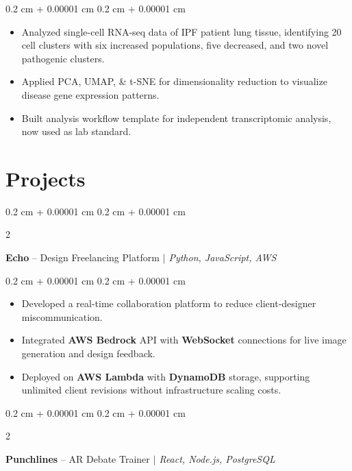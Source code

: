 \documentclass[10pt, letterpaper]{article}
\newenvironment{highlights}{
    \begin{itemize}[
        topsep=0.10 cm,
        parsep=0.10 cm,
        partopsep=0pt,
        itemsep=0pt,
        leftmargin=0.4 cm + 10pt
    ]
}{
    \end{itemize}
} %
\newenvironment{onecolentry}{
    \begin{adjustwidth}{
        0.2 cm + 0.00001 cm
    }{
        0.2 cm + 0.00001 cm
    }
}{
    \end{adjustwidth}
} %
\newenvironment{twocolentry}[2][]{
    \onecolentry
    \def\secondColumn{#2}
    \setcolumnwidth{\fill, 5 cm}
    \begin{paracol}{2}
}{
    \switchcolumn \raggedleft \secondColumn
    \end{paracol}
    \endonecolentry
} %
\let\hrefWithoutArrow\href
\renewcommand{\href}[2]{\hrefWithoutArrow{#1}{\ifthenelse{\equal{#2}{}}{ }{#2 }\raisebox{.15ex}{\footnotesize \faExternalLink*}}}
\begin{document}
        \vspace{0.10 cm}
        \begin{onecolentry}
            \begin{highlights}
                \item Analyzed single-cell RNA-seq data of IPF patient lung tissue, identifying 20 cell clusters with six increased populations, five decreased, and two novel pathogenic clusters.
                \item Applied PCA, UMAP, \& t-SNE for dimensionality reduction to visualize disease gene expression patterns.
                \item Built analysis workflow template for independent transcriptomic analysis, now used as lab standard.
            \end{highlights}
        \end{onecolentry}

    
    \section{Projects}
        
        \begin{twocolentry}{}
            \textbf{Echo} -- Design Freelancing Platform \textit{ $|$ Python, JavaScript, AWS}
        \end{twocolentry}

        \vspace{0.10 cm}
        \begin{onecolentry}
            \begin{highlights}
                \item Developed a real-time collaboration platform to reduce client-designer miscommunication.
                \item Integrated \textbf{AWS Bedrock} API with \textbf{WebSocket} connections for live image generation and design feedback.
                \item Deployed on \textbf{AWS Lambda} with \textbf{DynamoDB} storage, supporting unlimited client revisions without infrastructure scaling costs.
            \end{highlights}
        \end{onecolentry}


        \vspace{0.3 cm}

        \begin{twocolentry}{}
            \textbf{Punchlines} -- AR Debate Trainer \textit{ $|$ React, Node.js, PostgreSQL}
        \end{twocolentry}
\end{document}
